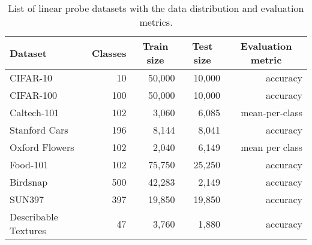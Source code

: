 \documentclass{article} \usepackage{iclr2023_conference,times}
\begin{document}
\begin{table}
	\caption{List of linear probe datasets with the data distribution and evaluation metrics.}
	\label{linearprobedatasets}
	\begin{center}
		\begin{tabular}{lrrrr}
			\toprule
			\multicolumn{1}{l}{\bf Dataset} & \multicolumn{1}{c}{\bf Classes} & \multicolumn{1}{c}{\bf Train size} & \multicolumn{1}{c}{\bf Test size} & \multicolumn{1}{c}{\bf Evaluation metric} \\
			\midrule
			CIFAR-10                        & 10                              & 50,000                             & 10,000                            & accuracy                                  \\
			CIFAR-100                       & 100                             & 50,000                             & 10,000                            & accuracy                                  \\
			Caltech-101                     & 102                             & 3,060                              & 6,085                             & mean-per-class                            \\
			Stanford Cars                   & 196                             & 8,144                              & 8,041                             & accuracy                                  \\
			Oxford Flowers                  & 102                             & 2,040                              & 6,149                             & mean per class                            \\
			Food-101                        & 102                             & 75,750                             & 25,250                            & accuracy                                  \\
			Birdsnap                        & 500                             & 42,283                             & 2,149                             & accuracy                                  \\
			SUN397                          & 397                             & 19,850                             & 19,850                            & accuracy                                  \\
			Describable Textures            & 47                              & 3,760                              & 1,880                             & accuracy                                  \\

\end{tabular}
\end{center}
\end{table}
\end{document}

